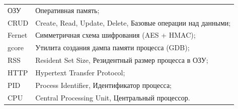 
\noindent
\begin{tabular}{@{}p{2.6cm}@{\ \mdash\ }p{12.0cm}@{}}
ОЗУ & Оперативная память;\\
CRUD & Create, Read, Update, Delete, Базовые операции над данными;\\
Fernet & Симметричная схема шифрования (AES + HMAC);\\
gcore & Утилита создания дампа памяти процесса (GDB);\\
RSS & Resident Set Size, Резидентный размер процесса в ОЗУ;\\
HTTP & Hypertext Transfer Protocol;\\
PID & Process Identifier, Идентификатор процесса;\\
CPU & Central Processing Unit, Центральный процессор.
\end{tabular}
